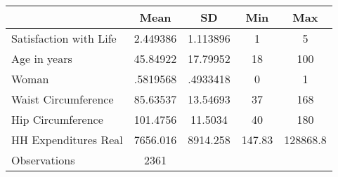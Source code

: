\documentclass[]{article}
\begin{document}
{
\def\sym#1{\ifmmode^{#1}\else\(^{#1}\)\fi}
\begin{tabular}{l*{1}{cccc}}
\hline\hline
                    &        Mean&          SD&         Min&         Max\\
\hline
Satisfaction with Life&    2.449386&    1.113896&           1&           5\\
Age in years        &    45.84922&    17.79952&          18&         100\\
Woman               &    .5819568&    .4933418&           0&           1\\
Waist Circumference &    85.63537&    13.54693&          37&         168\\
Hip Circumference   &    101.4756&     11.5034&          40&         180\\
HH Expenditures Real&    7656.016&    8914.258&      147.83&    128868.8\\
\hline
Observations        &        2361&            &            &            \\
\hline\hline
\end{tabular}
}
\end{document}
